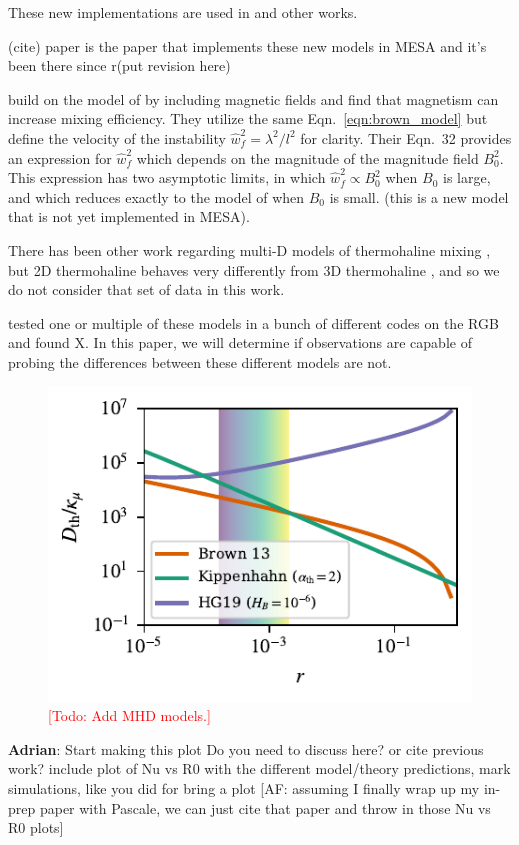 These new implementations are used in \citep{bauer_bildsten_2019} and other works.

(cite) paper is the paper that implements these new models in MESA and it's been there since r(put revision here)


\citet{harrington} build on the model of \citet{brown_etal_2013} by including magnetic fields and find that magnetism can increase mixing efficiency.
They utilize the same Eqn.~\ref{eqn:brown_model} but define the velocity of the instability $\hat{w}_f^2 = \lambda^2/l^2$ for clarity. 
Their Eqn.~32 provides an expression for $\hat{w}_f^2$ which depends on the magnitude of the magnitude field $B_0^2$.
This expression has two asymptotic limits, in which $\hat{w}_f^2 \propto B_0^2$ when $B_0$ is large, and which reduces exactly to the model of \citet{brown_etal_2013} when $B_0$ is small.
(this is a new model that is not yet implemented in MESA).


There has been other work regarding multi-D models of thermohaline mixing \citep{denissenkov_2010, denissenkov_merryfield_2011}, but 2D thermohaline behaves very differently from 3D thermohaline \citep{garaud_brummell_2015}, and so we do not consider that set of data in this work.

\citet{lattanzio_etal_2015} tested one or multiple of these models in a bunch of different codes on the RGB and found X.
In this paper, we will determine if observations are capable of probing the differences between these different models are not.

\begin{figure}
    \centering
    \includegraphics[width=\columnwidth]{Nu_models_comparison.pdf}
    \caption{\textcolor{red}{[Todo: Add MHD models.]}}
    \label{fig:parameterization_compare}
\end{figure}

\textbf{Adrian}: Start making this plot
Do you need to discuss here? or cite previous work? include plot of Nu vs R0 with the different model/theory predictions, mark simulations, like you did for bring a plot [AF: assuming I finally wrap up my in-prep paper with Pascale, we can just cite that paper and throw in those Nu vs R0 plots]
